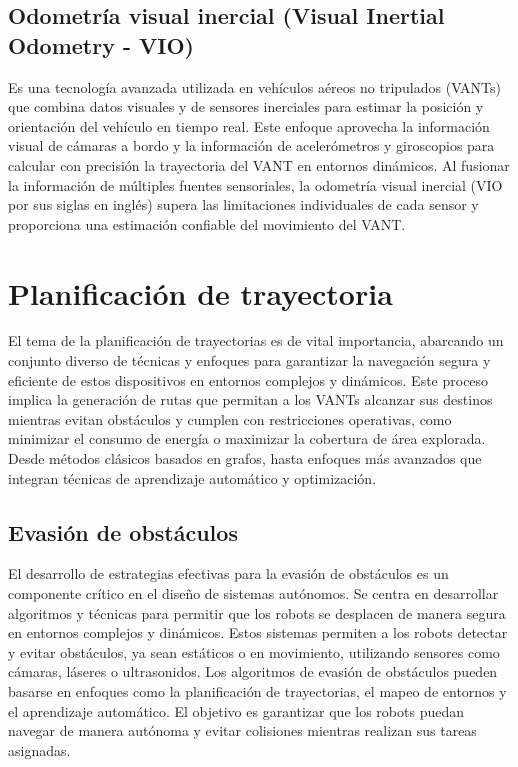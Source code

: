 
\subsection{Odometría visual inercial (Visual Inertial Odometry - VIO)}

Es una tecnología avanzada utilizada en vehículos aéreos no tripulados (VANTs) que combina datos visuales y de sensores inerciales para estimar la posición y orientación del vehículo en tiempo real. Este enfoque aprovecha la información visual de cámaras a bordo y la información de acelerómetros y giroscopios para calcular con precisión la trayectoria del VANT en entornos dinámicos. Al fusionar la información de múltiples fuentes sensoriales, la odometría visual inercial (VIO por sus siglas en inglés) supera las limitaciones individuales de cada sensor y proporciona una estimación confiable del movimiento del VANT.


\section{Planificación de trayectoria}

El tema de la planificación de trayectorias es de vital importancia, abarcando un conjunto diverso de técnicas y enfoques para garantizar la navegación segura y eficiente de estos dispositivos en entornos complejos y dinámicos. Este proceso implica la generación de rutas que permitan a los VANTs alcanzar sus destinos mientras evitan obstáculos y cumplen con restricciones operativas, como minimizar el consumo de energía o maximizar la cobertura de área explorada. Desde métodos clásicos basados en grafos, hasta enfoques más avanzados que integran técnicas de aprendizaje automático y optimización.


\subsection{Evasión de obstáculos}

El desarrollo de estrategias efectivas para la evasión de obstáculos es un componente crítico en el diseño de sistemas autónomos. Se centra en desarrollar algoritmos y técnicas para permitir que los robots se desplacen de manera segura en entornos complejos y dinámicos. Estos sistemas permiten a los robots detectar y evitar obstáculos, ya sean estáticos o en movimiento, utilizando sensores como cámaras, láseres o ultrasonidos. Los algoritmos de evasión de obstáculos pueden basarse en enfoques como la planificación de trayectorias, el mapeo de entornos y el aprendizaje automático. El objetivo es garantizar que los robots puedan navegar de manera autónoma y evitar colisiones mientras realizan sus tareas asignadas.


